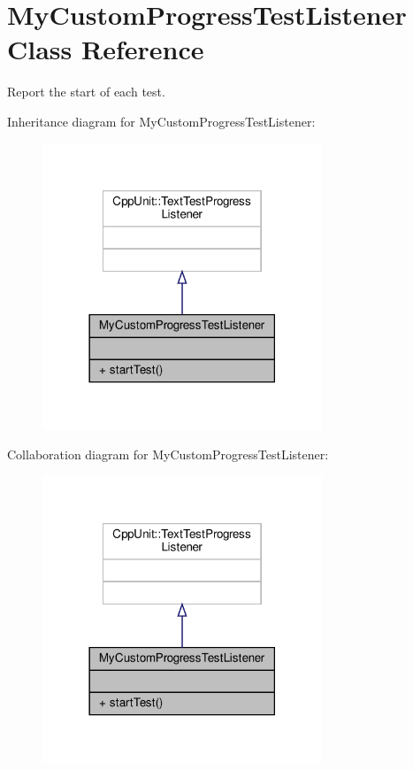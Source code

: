 \hypertarget{classMyCustomProgressTestListener}{}\section{My\+Custom\+Progress\+Test\+Listener Class Reference}
\label{classMyCustomProgressTestListener}


Report the start of each test.  




Inheritance diagram for My\+Custom\+Progress\+Test\+Listener\+:\nopagebreak
\begin{figure}[H]
\begin{center}
\leavevmode
\includegraphics[width=237pt]{classMyCustomProgressTestListener__inherit__graph}
\end{center}
\end{figure}


Collaboration diagram for My\+Custom\+Progress\+Test\+Listener\+:\nopagebreak
\begin{figure}[H]
\begin{center}
\leavevmode
\includegraphics[width=237pt]{classMyCustomProgressTestListener__coll__graph}
\end{center}
\end{figure}
